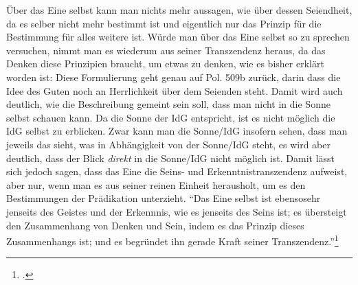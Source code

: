 Über das Eine selbst kann man nichts mehr aussagen, wie über dessen Seiendheit, da es selber nicht mehr bestimmt ist und eigentlich nur das Prinzip für die Bestimmung für alles weitere ist. Würde man über das Eine selbst so zu sprechen versuchen, nimmt man es wiederum aus seiner Transzendenz heraus, da das Denken diese Prinzipien braucht, um etwas zu denken, wie es bisher erklärt worden ist:
Diese Formulierung geht genau auf Pol. 509b zurück, darin dass die Idee des Guten noch an Herrlichkeit über dem Seienden steht. Damit wird auch deutlich, wie die Beschreibung gemeint sein soll, dass man nicht in die Sonne selbst schauen kann. Da die Sonne der IdG entspricht, ist es nicht möglich die IdG selbst zu erblicken. Zwar kann man die Sonne/IdG insofern sehen, dass man jeweils das sieht, was in Abhängigkeit von der Sonne/IdG steht, es wird aber deutlich, dass der Blick \emph{direkt} in die Sonne/IdG nicht möglich ist.
Damit lässt sich jedoch sagen, dass das Eine die Seins- und Erkenntnistranszendenz aufweist, aber nur, wenn man es aus seiner reinen Einheit herausholt, um es den Bestimmungen der Prädikation unterzieht. \enquote{Das Eine selbst ist ebensosehr jenseits des Geistes und der Erkennnis, wie es jenseits des Seins ist; es übersteigt den Zusammenhang von Denken und Sein, indem es das Prinzip dieses Zusammenhangs ist; und es begründet ihn gerade Kraft seiner Transzendenz.}\footcite[][S. 102]{halfwassen2015spuren}
